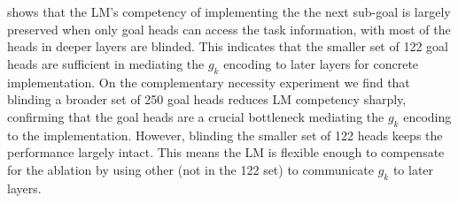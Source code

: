  shows that the LM's competency of implementing the the next sub-goal is largely preserved when only goal heads can access the task information, with most of the heads in deeper layers are blinded. This indicates that the smaller set of 122 goal heads are sufficient in mediating the $g_k$ encoding to later layers for concrete implementation. On the complementary necessity experiment we find that blinding a broader set of 250 goal heads reduces LM competency sharply, confirming that the goal heads are a crucial bottleneck mediating the $g_k$ encoding to the implementation. However, blinding the smaller set of 122 heads keeps the performance largely intact. This means the LM is flexible enough to compensate for the ablation by using other \goalheads (not in the 122 set) to communicate $g_k$ to later layers.


